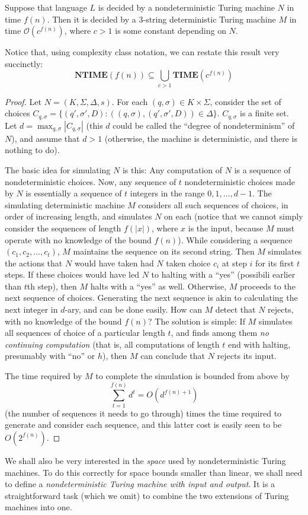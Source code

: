 \documentclass[12pt]{article}
\begin{document}
\begin{defbox}
  Suppose that language $L$ is decided by a nondeterministic Turing machine $N$ in time $f(n)$. Then it is decided by a 3-string deterministic Turing machine $M$ in time $\mathcal{O}(c^{f(n)})$, where $c > 1$ is some constant depending on $N$.

Notice that, using complexity class notation, we can restate this result very succinctly:
\[
\textbf{NTIME}(f(n)) \subseteq \bigcup_{c > 1} \textbf{TIME}(c^{f(n)})
\]
\end{defbox}
\begin{proof}
  Let $N = (K, \Sigma, \Delta, s)$. For each $(q, \sigma) \in K \times \Sigma$, consider the set of choices $C_{q,\sigma} = \{(q', \sigma', D) : ((q, \sigma), (q', \sigma', D)) \in \Delta\}$. $C_{q,\sigma}$ is a finite set. Let $d = \max_{q,\sigma} |C_{q,\sigma}|$ (this $d$ could be called the ``degree of nondeterminism'' of $N$), and assume that $d > 1$ (otherwise, the machine is deterministic, and there is nothing to do).

The basic idea for simulating $N$ is this: Any computation of $N$ is a sequence of nondeterministic choices. Now, any sequence of $t$ nondeterministic choices made by $N$ is essentially a sequence of $t$ integers in the range $0, 1, \ldots, d - 1$. The simulating deterministic machine $M$ considers all such sequences of choices, in order of increasing length, and simulates $N$ on each (notice that we cannot simply consider the sequences of length $f(|x|)$, where $x$ is the input, because $M$ must operate with no knowledge of the bound $f(n)$). While considering a sequence $(c_1, c_2, \ldots, c_t)$, $M$ maintains the sequence on its second string. Then $M$ simulates the actions that $N$ would have taken had $N$ taken choice $c_i$ at step $i$ for its first $t$ steps. If these choices would have led $N$ to halting with a ``yes'' (possibili earlier than $t$th step), then $M$ halts with a ``yes'' as well. Otherwise, $M$  proceeds to the next sequence of choices. Generating the next sequence is akin to calculating the next integer in $d$-ary, and can be done easily.
How can $M$ detect that $N$ rejects, with no knowledge of the bound $f(n)$? 
The solution is simple: If $M$ simulates all sequences of choice of a particular 
length $t$, and finds among them \textit{no continuing computation} (that is, all 
computations of length $t$ end with halting, presumably with ``no'' or $h$), then $M$ can 
conclude that $N$ rejects its input.

The time required by $M$ to complete the simulation is bounded from above 
by 
\[
\sum_{t=1}^{f(n)} d^t = O(d^{f(n)+1})
\]
(the number of sequences it needs to go through) times the time required to generate and consider each sequence, and this latter cost is easily seen to be $O(2^{f(n)})$.
\end{proof}
We shall also be very interested in the \textit{space} used by nondeterministic 
Turing machines. To do this correctly for space bounds smaller than linear, we 
shall need to define a \textit{nondeterministic Turing machine with input and output}. 
It is a straightforward task (which we omit) to combine the two extensions of 
Turing machines into one.
\end{document}
